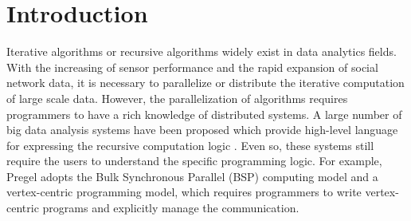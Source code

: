 \section{Introduction}
Iterative algorithms or recursive algorithms widely exist in data analytics fields. With the increasing of sensor performance and the rapid expansion of social network data, it is necessary to parallelize or distribute the iterative computation of large scale data. However, the parallelization of algorithms requires programmers to have a rich knowledge of distributed systems. A large number of big data analysis systems have been proposed which provide high-level language for expressing the recursive computation logic \cite{Dean:2004:MSD:1251254.1251264,giraph,maiter,Fan:2017:PSG:3035918.3035942,Malewicz2010Pregel,DBLP:journals/corr/GonzalezBJFHGS15,8017445,Low:2012:DGF:2212351.2212354,Han:2015:GUB:2777598.2777604,grace}. Even so, these systems still require the users to understand the specific programming logic. For example, Pregel \cite{Malewicz2010Pregel} adopts the Bulk Synchronous Parallel (BSP) computing model and a vertex-centric programming model, which requires programmers to write vertex-centric programs and explicitly manage the communication.

